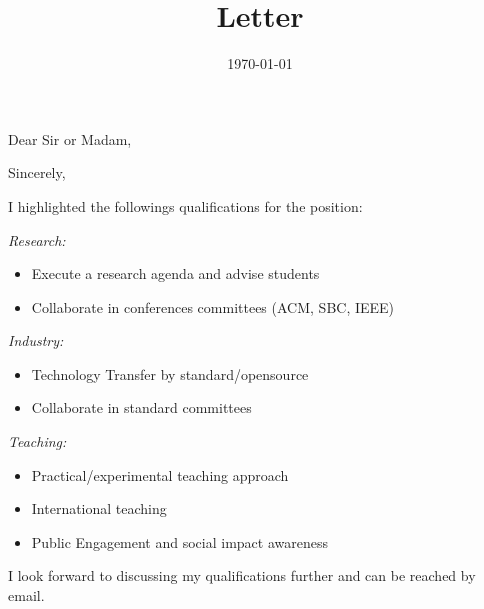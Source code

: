 \documentclass[10pt,a4paper,sans,colorlinks]{moderncv}
\title{Letter}
\begin{document}
\hfHyperrefSetupBlueLinks
\recipient{\ }{}
\opening{Dear Sir or Madam,}
\date{\today}
\closing{Sincerely,}

\makelettertitle

\justify


I highlighted the followings qualifications for the position:

\textit{Research:}
\begin{itemize}[mynosep]
  \item Execute a research agenda and advise students
  \item Collaborate in conferences committees (ACM, SBC, IEEE)
\end{itemize}

\textit{Industry:}
\begin{itemize}[mynosep]
  \item Technology  Transfer by standard/opensource
  \item Collaborate in standard committees
\end{itemize}

\textit{Teaching:}
\begin{itemize}[mynosep]
  \item Practical/experimental teaching approach
  \item International teaching
  \item Public Engagement and social impact awareness
\end{itemize}

I look forward to discussing my qualifications further and can be reached by email.

\makeletterclosing
\end{document}
